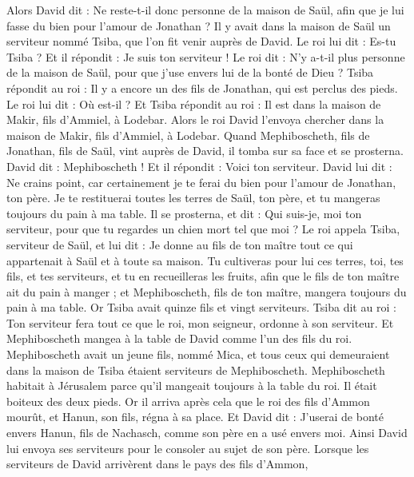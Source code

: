 \begin{multicols}{2}
\VerseOne{}Alors David dit : Ne reste-t-il donc personne de la maison de Saül, afin que je lui fasse du bien pour l'amour de Jonathan ?
Il y avait dans la maison de Saül un serviteur nommé Tsiba, que l'on fit venir auprès de David. Le roi lui dit : Es-tu Tsiba ? Et il répondit : Je suis ton serviteur !
Le roi dit : N'y a-t-il plus personne de la maison de Saül, pour que j'use envers lui de la bonté de Dieu ? Tsiba répondit au roi : Il y a encore un des fils de Jonathan, qui est perclus des pieds.
Le roi lui dit : Où est-il ? Et Tsiba répondit au roi : Il est dans la maison de Makir, fils d'Ammiel, à Lodebar.
Alors le roi David l'envoya chercher dans la maison de Makir, fils d'Ammiel, à Lodebar.
Quand Mephiboscheth, fils de Jonathan, fils de Saül, vint auprès de David, il tomba sur sa face et se prosterna. David dit : Mephiboscheth ! Et il répondit : Voici ton serviteur.
David lui dit : Ne crains point, car certainement je te ferai du bien pour l'amour de Jonathan, ton père. Je te restituerai toutes les terres de Saül, ton père, et tu mangeras toujours du pain à ma table.
Il se prosterna, et dit : Qui suis-je, moi ton serviteur, pour que tu regardes un chien mort tel que moi ?
Le roi appela Tsiba, serviteur de Saül, et lui dit : Je donne au fils de ton maître tout ce qui appartenait à Saül et à toute sa maison.
Tu cultiveras pour lui ces terres, toi, tes fils, et tes serviteurs, et tu en recueilleras les fruits, afin que le fils de ton maître ait du pain à manger ; et Mephiboscheth, fils de ton maître, mangera toujours du pain à ma table. Or Tsiba avait quinze fils et vingt serviteurs.
Tsiba dit au roi : Ton serviteur fera tout ce que le roi, mon seigneur, ordonne à son serviteur. Et Mephiboscheth mangea à la table de David comme l'un des fils du roi.
Mephiboscheth avait un jeune fils, nommé Mica, et tous ceux qui demeuraient dans la maison de Tsiba étaient serviteurs de Mephiboscheth.
Mephiboscheth habitait à Jérusalem parce qu'il mangeait toujours à la table du roi. Il était boiteux des deux pieds.
\VerseOne{}Or il arriva après cela que le roi des fils d'Ammon mourût, et Hanun, son fils, régna à sa place.
Et David dit : J'userai de bonté envers Hanun, fils de Nachasch, comme son père en a usé envers moi. Ainsi David lui envoya ses serviteurs pour le consoler au sujet de son père. Lorsque les serviteurs de David arrivèrent dans le pays des fils d'Ammon,

\end{multicols}
